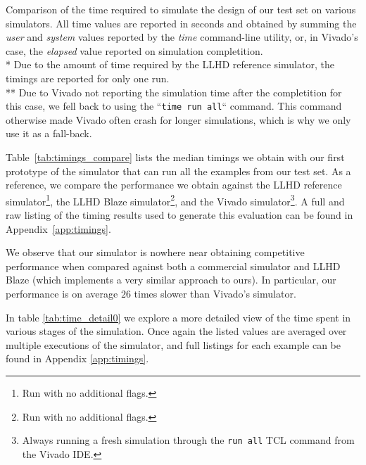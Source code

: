 \begin{table}[ht]
  \caption[Comparison of simulation timings for our first simulator prototype.]{Comparison of the time required to simulate the design of our test set on various simulators. All time values are reported in seconds and obtained by summing the \textit{user} and \textit{system} values reported by the \textit{time} command-line utility, or, in Vivado's case, the \textit{elapsed} value reported on simulation completition. \\ * Due to the amount of time required by the LLHD reference simulator, the timings are reported for only one run. \\ ** Due to Vivado not reporting the simulation time after the completition for this case, we fell back to using the “\texttt{time {run all}}“ command. This command otherwise made Vivado often crash for longer simulations, which is why we only use it as a fall-back.}
  \label{tab:timings_compare}
\end{table}

Table~\ref{tab:timings_compare} lists the median timings we obtain with our first prototype of the simulator that can run all the examples from our test set. As a reference, we compare the performance we obtain against the LLHD reference simulator\footnote{Run with no additional flags.}, the LLHD Blaze simulator\footnote{Run with no additional flags.}, and the Vivado simulator\footnote{Always running a fresh simulation through the \texttt{run all} TCL command from the Vivado IDE.}. A full and raw listing of the timing results used to generate this evaluation can be found in Appendix~\ref{app:timings}.

We observe that our simulator is nowhere near obtaining competitive performance when compared against both a commercial simulator and LLHD Blaze (which implements a very similar approach to ours). In particular, our performance is on average $26$ times slower than Vivado's simulator.

In table \ref{tab:time_detail0} we explore a more detailed view of the time spent in various stages of the simulation. Once again the listed values are averaged over multiple executions of the simulator, and full listings for each example can be found in Appendix \ref{app:timings}.

